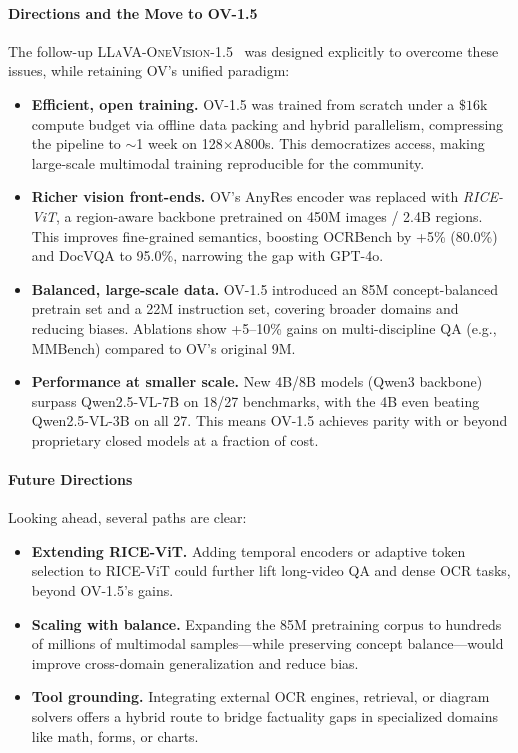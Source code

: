 \begin{enrichment}
\begin{enrichment}
        \paragraph{Directions and the Move to OV-1.5}
        The follow-up \textsc{LLaVA-OneVision-1.5}~\cite{an2025_llavaonevision15} was designed explicitly to overcome these issues, while retaining OV’s unified paradigm:
        \begin{itemize}
            \item \textbf{Efficient, open training.} OV-1.5 was trained from scratch under a $\$16$k compute budget via offline data packing and hybrid parallelism, compressing the pipeline to $\sim$1 week on 128$\times$A800s. This democratizes access, making large-scale multimodal training reproducible for the community.
            \item \textbf{Richer vision front-ends.} OV’s AnyRes encoder was replaced with \emph{RICE-ViT}, a region-aware backbone pretrained on 450M images / 2.4B regions. This improves fine-grained semantics, boosting OCRBench by +5\% (80.0\%) and DocVQA to 95.0\%, narrowing the gap with GPT-4o.
            \item \textbf{Balanced, large-scale data.} OV-1.5 introduced an 85M concept-balanced pretrain set and a 22M instruction set, covering broader domains and reducing biases. Ablations show +5–10\% gains on multi-discipline QA (e.g., MMBench) compared to OV’s original 9M.
            \item \textbf{Performance at smaller scale.} New 4B/8B models (Qwen3 backbone) surpass Qwen2.5-VL-7B on 18/27 benchmarks, with the 4B even beating Qwen2.5-VL-3B on all 27. This means OV-1.5 achieves parity with or beyond proprietary closed models at a fraction of cost.
        \end{itemize}
        
        \paragraph{Future Directions}
        Looking ahead, several paths are clear:
        \begin{itemize}
            \item \textbf{Extending RICE-ViT.} Adding temporal encoders or adaptive token selection to RICE-ViT could further lift long-video QA and dense OCR tasks, beyond OV-1.5’s gains.
            \item \textbf{Scaling with balance.} Expanding the 85M pretraining corpus to hundreds of millions of multimodal samples—while preserving concept balance—would improve cross-domain generalization and reduce bias.
            \item \textbf{Tool grounding.} Integrating external OCR engines, retrieval, or diagram solvers offers a hybrid route to bridge factuality gaps in specialized domains like math, forms, or charts.
        \end{itemize}
        

\end{enrichment}
\end{enrichment}
